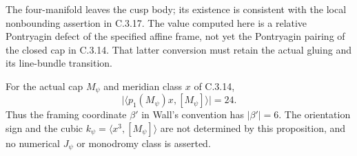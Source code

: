 \begin{remark}[Scope]
The four-manifold leaves the cusp body; its existence is
consistent with the local nonbounding assertion in C.3.17.
The value computed here is a relative Pontryagin defect of
the specified affine frame, not yet the Pontryagin pairing
of the closed cap in C.3.14. That latter conversion must
retain the actual gluing and its line-bundle transition.
\end{remark}
\begin{proposition}
For the actual cap $M_\psi$ and meridian class $x$ of C.3.14,
\[
 \bigl|\langle p_1(M_\psi)x,[M_\psi]\rangle\bigr|=24.
\]
Thus the framing coordinate $\beta'$ in Wall's convention has
$|\beta'|=6$. The orientation sign and the cubic
$k_\psi=\langle x^3,[M_\psi]\rangle$ are not determined by
this proposition, and no numerical $J_\psi$ or monodromy class
is asserted.
\end{proposition}
